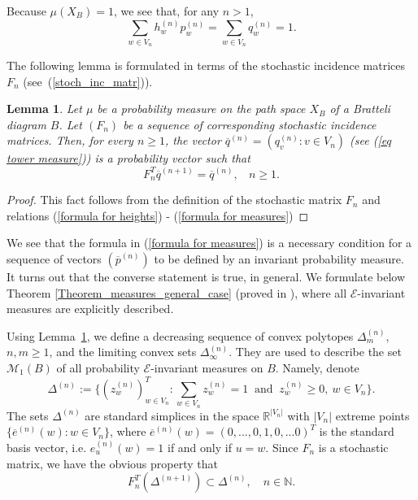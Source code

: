 \documentclass[11pt, english, reqno]{amsart}
\theoremstyle{definition}
\theoremstyle{remark}
\theoremstyle{plain}
\newtheorem{lemma}[defin]{Lemma}
\def\ov{\overline}
\numberwithin{equation}{section}
\begin{document}
Because $\mu(X_B) =1$, we see that,  for any $n >1$,
$$
\sum_{w \in V_n} h_w^{(n)}p_w^{(n)} = \sum_{w \in V_n} q_w^{(n)} = 1.
$$

The following lemma is formulated in terms of the stochastic incidence matrices $F_n$
 (see~(\ref{stoch_inc_matr})).
\begin{lemma}\label{formula_for_qn}
Let $\mu$ be a probability measure on the path
 space $X_B$ of a Bratteli diagram $B$. Let $(F_n)$ be a sequence
 of corresponding stochastic incidence matrices. Then, for every $n
  \geq 1$, the vector $\ov q^{(n)} = ( q^{(n)}_v : v \in
   V_n)$ (see (\ref{eq tower measure})) is a  probability vector  such that
 \begin{equation}\label{eq stoch matrix and measures}
 F_n^T \ov q^{(n+1)} = \ov q^{(n)}, \ \ \ \ n  \geq 1.
 \end{equation}
\end{lemma}

\begin{proof}
This fact   follows from the definition of the stochastic matrix $F_n$
 and relations (\ref{formula for heights}) - (\ref{formula for
 measures})
\end{proof}

We see that the formula in (\ref{formula for measures}) is a necessary
condition for a sequence of vectors $(\ov p^{(n)})$ to be defined by an
  invariant  probability measure. It turns out that the  converse
   statement is  true, in general. We formulate below Theorem
    \ref{Theorem_measures_general_case}  (proved in
\cite{BezuglyiKwiatkowskiMedynetsSolomyak2010}), where all
 $\mathcal E$-invariant measures are explicitly
described.

Using Lemma~\ref{formula_for_qn},  we
 define a decreasing sequence of convex polytopes $\Delta_m^{(n)}$,
 $n,m \geq 1$, and the limiting convex sets $\Delta_{\infty}^{(n)}$. They
 are used  to describe the set  $\mathcal{M}_1(B)$ of all probability
 $\mathcal{E}$-invariant measures on $B$. Namely, denote
$$
\Delta^{(n)} := \{(z^{(n)}_w)_{w \in V_n}^T : \sum_{w \in V_n}
z^{(n)}_w = 1\ \mbox{ and } \ z^{(n)}_w   \geq 0, \  w \in V_n \}.
$$
The sets $\Delta^{(n)}$ are standard simplices in the space
$\mathbb{R}^{|V_n|}$ with $|V_n|$
 extreme points $\{\ov e^{(n)}(w) : w \in V_n\}$, where
$\ov e^{(n)}(w) = (0, ... , 0, 1, 0,...0)^T$ is the standard basis vector, i.e.
$e^{(n)}_u(w) = 1$ if and only if $u = w$.
Since $F_n$ is a stochastic matrix, we have the obvious property that
 $$
 F_{n}^T(\Delta^{(n+1)}) \subset \Delta^{(n)}, \quad n \in \mathbb{N}.
 $$
\end{document}
